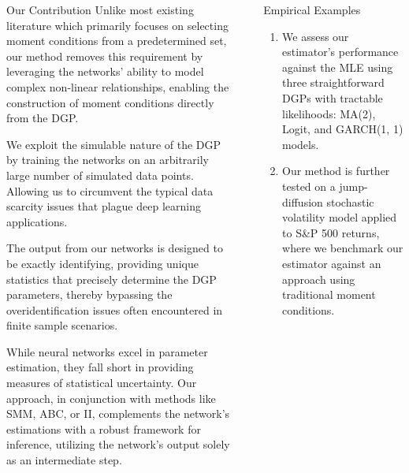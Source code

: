 \documentclass[final]{beamer}
\newlength{\sepwidth}
\newlength{\colwidth}
\newlength{\colwidthsmall}
\newlength{\colwidthlarge}
\newcommand{\separatorcolumn}{\begin{column}{\sepwidth}\end{column}}
\begin{document}
\begin{frame}[t]
\begin{columns}[t]
\begin{column}{\colwidthsmall}
\begin{alertblock}{Our Contribution}
        Unlike most existing literature which primarily focuses on selecting moment conditions from a predetermined set, our method removes this requirement by leveraging the networks' ability to model complex non-linear relationships, enabling the construction of moment conditions directly from the DGP.

        We exploit the simulable nature of the DGP by training the networks on an arbitrarily large number of simulated data points. Allowing us to circumvent the typical data scarcity issues that plague deep learning applications.

        The output from our networks is designed to be exactly identifying, providing unique statistics that precisely determine the DGP parameters, thereby bypassing the overidentification issues often encountered in finite sample scenarios.
        
        While neural networks excel in parameter estimation, they fall short in providing measures of statistical uncertainty. Our approach, in conjunction with methods like SMM, ABC, or II, complements the network's estimations with a robust framework for inference, utilizing the network's output solely as an intermediate step.         
      \end{alertblock}
    \end{column}
    
    \separatorcolumn
    
   
    \begin{column}{\colwidthlarge}

      \begin{block}{Empirical Examples}
        \begin{enumerate}
          \item We assess our estimator's performance against the MLE using three straightforward DGPs with tractable likelihoods: MA(2), Logit, and GARCH(1, 1) models.
          \item Our method is further tested on a jump-diffusion stochastic volatility model applied to S\&P 500 returns, where we benchmark our estimator against an approach using traditional moment conditions.
        \end{enumerate}
      \end{block}\vspace{-.5em}


\end{column}
\end{columns}
\end{frame}
\end{document}
